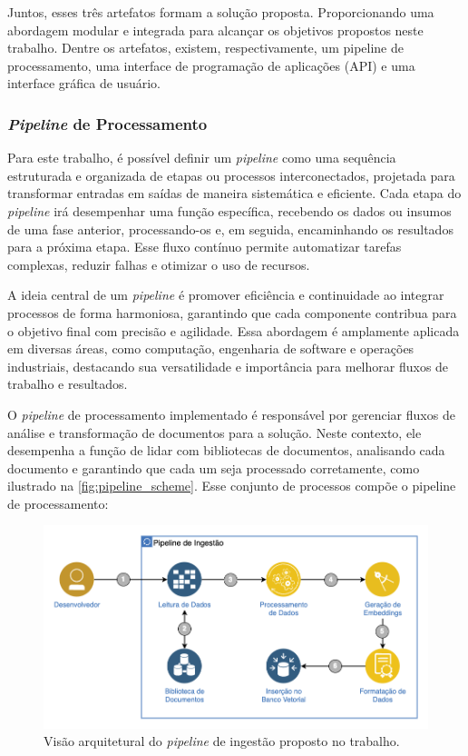 \documentclass[a4paper, 12pt]{article}
\begin{document}
    Juntos, esses três artefatos formam a solução proposta. Proporcionando uma abordagem modular e integrada para alcançar os objetivos propostos neste trabalho. Dentre os artefatos, existem, respectivamente, um pipeline de processamento, uma interface de programação de aplicações (API) e uma interface gráfica de usuário.
    
    \subsubsection{\textit{Pipeline} de Processamento} \label{sec:pipeline}

    Para este trabalho, é possível definir um \textit{pipeline} como uma sequência estruturada e organizada de etapas ou processos interconectados, projetada para transformar entradas em saídas de maneira sistemática e eficiente. Cada etapa do \textit{pipeline} irá desempenhar uma função específica, recebendo os dados ou insumos de uma fase anterior, processando-os e, em seguida, encaminhando os resultados para a próxima etapa. Esse fluxo contínuo permite automatizar tarefas complexas, reduzir falhas e otimizar o uso de recursos. 
    
    A ideia central de um \textit{pipeline} é promover eficiência e continuidade ao integrar processos de forma harmoniosa, garantindo que cada componente contribua para o objetivo final com precisão e agilidade. Essa abordagem é amplamente aplicada em diversas áreas, como computação, engenharia de software e operações industriais, destacando sua versatilidade e importância para melhorar fluxos de trabalho e resultados. 

    O \textit{pipeline} de processamento implementado é responsável por gerenciar fluxos de análise e transformação de documentos para a solução. Neste contexto, ele desempenha a função de lidar com bibliotecas de documentos, analisando cada documento e garantindo que cada um seja processado corretamente, como ilustrado na \autoref{fig:pipeline_scheme}. Esse conjunto de processos compõe o pipeline de processamento:
    
    \begin{figure}[ht]
        \includegraphics[width=\textwidth,height=0.9\textheight,keepaspectratio]{architecture-pipeline.png}
        \centering
        \caption{Visão arquitetural do \textit{pipeline} de ingestão proposto no trabalho.}
        \centering
        \label{fig:pipeline_scheme}
    \end{figure}
    
\end{document}
